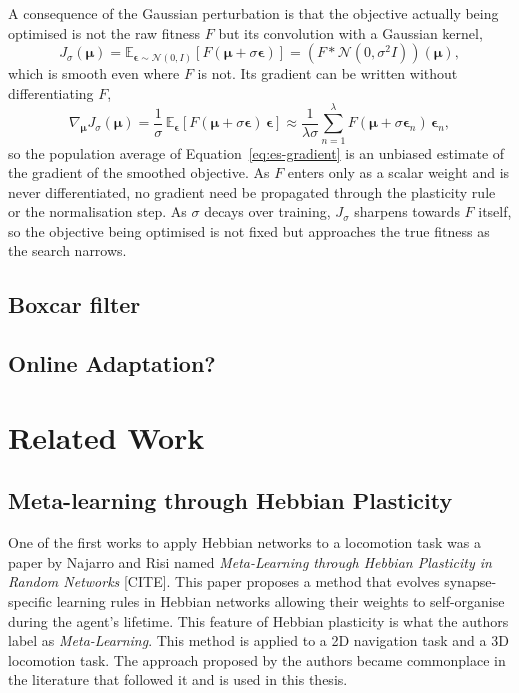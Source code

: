 \documentclass{article} %
\begin{document}
A consequence of the Gaussian perturbation is that the objective actually being
optimised is not the raw fitness $F$ but its convolution with a Gaussian
kernel,
\begin{equation}
J_\sigma(\bm{\mu}) = \mathbb{E}_{\bm{\epsilon} \sim \mathcal{N}(0, I)}
\left[ F(\bm{\mu} + \sigma \bm{\epsilon}) \right]
= \left( F * \mathcal{N}(0, \sigma^2 I) \right)(\bm{\mu}),
\label{eq:es-smoothed}
\end{equation}
which is smooth even where $F$ is not. Its gradient can be written without
differentiating $F$,
\begin{equation}
\nabla_{\bm{\mu}} J_\sigma(\bm{\mu}) = \frac{1}{\sigma}\,
\mathbb{E}_{\bm{\epsilon}} \left[ F(\bm{\mu} + \sigma \bm{\epsilon})\,
\bm{\epsilon} \right] \approx \frac{1}{\lambda \sigma}
\sum_{n=1}^{\lambda} F(\bm{\mu} + \sigma \bm{\epsilon}_n)\, \bm{\epsilon}_n,
\label{eq:es-gradient}
\end{equation}
so the population average of Equation~\ref{eq:es-gradient} is an unbiased
estimate of the gradient of the smoothed objective. As $F$ enters only as a
scalar weight and is never differentiated, no gradient need be propagated
through the plasticity rule or the normalisation step. As $\sigma$ decays over
training, $J_\sigma$ sharpens towards $F$ itself, so the objective being
optimised is not fixed but approaches the true fitness as the search narrows.

\subsection{Boxcar filter}

\subsection{Online Adaptation?}

\section{Related Work}
\label{sec:related_works}

\subsection{Meta-learning through Hebbian Plasticity}
\label{subsec:meta-learning_through_hebbian_plasticity}

One of the first works to apply Hebbian networks to a locomotion task was a paper by Najarro and Risi named \textit{Meta-Learning through Hebbian Plasticity in Random Networks} [CITE]. This paper proposes a method that evolves synapse-specific learning rules in Hebbian networks allowing their weights to self-organise during the agent's lifetime. This feature of Hebbian plasticity is what the authors label as \textit{Meta-Learning}. This method is applied to a 2D navigation task and a 3D locomotion task. The approach proposed by the authors became commonplace in the literature that followed it and is used in this thesis.
\end{document}

